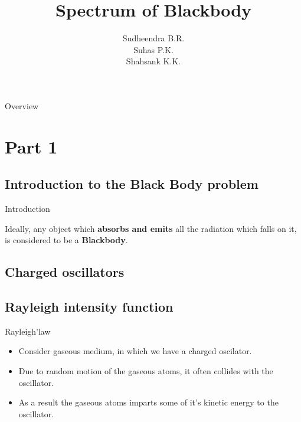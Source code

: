 \documentclass[aspectratio=169]{beamer}
\title{Spectrum of Blackbody}
\institute{{\footnotesize Guided by V.H. Belvadi} \\ Yuvaraja's College, Mysuru}
\author{Sudheendra B.R. \\ Suhas P.K. \\ Shahsank K.K.}
\date{}
\newcommand{\highlight}[1]{\textbf{#1}}
\begin{document}
\begin{frame}[noframenumbering]
	\titlepage
\end{frame}


\begin{frame}[noframenumbering]{Overview}
\tableofcontents
\end{frame}


\section{Part 1}

\subsection{Introduction to the Black Body problem}

\begin{frame}{Introduction}

{\large Ideally, any object which \highlight{absorbs and emits} all the radiation which falls on it, is considered to be a \highlight{Blackbody}.}

\end{frame}

\subsection{Charged oscillators}
 
\subsection{Rayleigh intensity function}

\begin{frame}{Rayleigh'law}

	\begin{itemize}
		
		\item Consider gaseous medium, in which we have a charged oscilator. \newline
		\item Due to random motion of the gaseous atoms, it often collides with the oscillator. \pause \newline
		\item As a result the gaseous atoms imparts some of it's kinetic energy to the oscillator.
		
	\end{itemize}
	
\end{frame}
\end{document}
